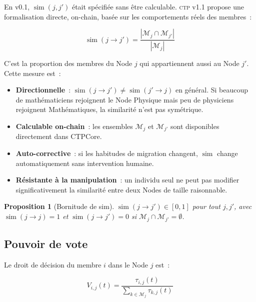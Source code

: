 \documentclass[12pt,a4paper]{article}
\theoremstyle{definition}
\theoremstyle{plain}
\newtheorem{proposition}{Proposition}[section]
\theoremstyle{remark}
\newcommand{\CTP}{\textsc{ctp}}
\newcommand{\trustscore}{\tau}
\newcommand{\1}{\mathbf{1}}
\begin{document}
En v0.1, $\operatorname{sim}(j, j')$ était spécifiée sans être calculable.
\CTP{} v1.1 propose une formalisation directe, on-chain, basée sur les
comportements réels des membres~:

\begin{equation}
\boxed{\operatorname{sim}(j \to j') =
\frac{|\mathcal{M}_j \cap \mathcal{M}_{j'}|}{|\mathcal{M}_j|}}
\label{eq:sim}
\end{equation}

C'est la proportion des membres du Node $j$ qui appartiennent aussi au
Node $j'$. Cette mesure est~:

\begin{itemize}
  \item \textbf{Directionnelle}~: $\operatorname{sim}(j \to j') \neq
    \operatorname{sim}(j' \to j)$ en général. Si beaucoup de
    mathématiciens rejoignent le Node Physique mais peu de physiciens
    rejoignent Mathématiques, la similarité n'est pas symétrique.
  \item \textbf{Calculable on-chain}~: les ensembles $\mathcal{M}_j$
    et $\mathcal{M}_{j'}$ sont disponibles directement dans CTPCore.
  \item \textbf{Auto-corrective}~: si les habitudes de migration
    changent, $\operatorname{sim}$ change automatiquement sans
    intervention humaine.
  \item \textbf{Résistante à la manipulation}~: un individu seul ne
    peut pas modifier significativement la similarité entre deux
    Nodes de taille raisonnable.
\end{itemize}

\begin{proposition}[Bornitude de sim]
$\operatorname{sim}(j \to j') \in [0,1]$ pour tout $j, j'$, avec
$\operatorname{sim}(j \to j) = 1$ et
$\operatorname{sim}(j \to j') = 0$ si $\mathcal{M}_j \cap \mathcal{M}_{j'} = \emptyset$.
\end{proposition}

\subsection{Pouvoir de vote}

Le droit de décision du membre $i$ dans le Node $j$ est~:

\begin{equation}
V_{i,j}(t) = \frac{\trustscore_{i,j}(t)}{\displaystyle\sum_{k \in \mathcal{M}_j} \trustscore_{k,j}(t)}
\label{eq:vote}
\end{equation}
\end{document}
